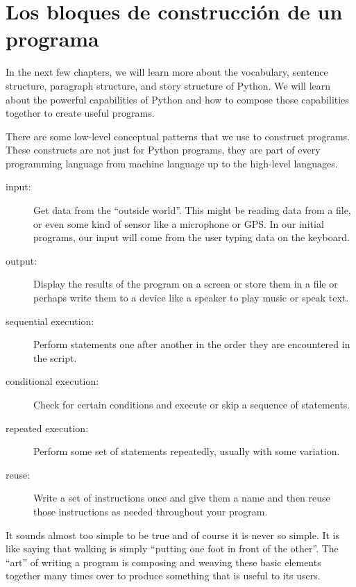 \section{Los bloques de construcci\'on de un programa}

In the next few chapters, we will learn more about the vocabulary, sentence structure,
paragraph structure, and story structure of Python.  We will learn about the powerful
capabilities of Python and how to compose those capabilities together to create useful
programs.

There are some low-level conceptual patterns that we use to construct programs.  These
constructs are not just for Python programs, they are part of every programming language
from machine language up to the high-level languages.

\begin{description}

\item[input:] Get data from the ``outside world''.  This might be 
reading data from a file, or even some kind of sensor like 
a microphone or GPS.  In our initial programs, our input will come from the user
typing data on the keyboard.

\item[output:] Display the results of the program on a screen
or store them in a file or perhaps write them to a device like a
speaker to play music or speak text.

\item[sequential execution:] Perform statements one after
another in the order they are encountered in the script.

\item[conditional execution:] Check for certain conditions and
execute or skip a sequence of statements.

\item[repeated execution:] Perform some set of statements 
repeatedly, usually with
some variation.

\item[reuse:] Write a set of instructions once and give them a name
and then reuse those instructions as needed throughout your program.

\end{description}

It sounds almost too simple to be true and of course it is never
so simple.  It is like saying that walking is simply
``putting one foot in front of the other''.  The ``art'' 
of writing a program is composing and weaving these
basic elements together many times over to produce something
that is useful to its users.

